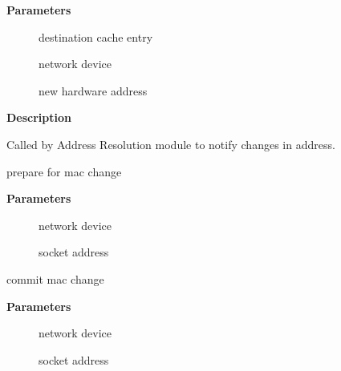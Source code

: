 \documentclass[a4paper,8pt,english]{sphinxmanual}
\begin{document}
\textbf{Parameters}
\begin{description}
\item[{}] \leavevmode
destination cache entry

\item[{}] \leavevmode
network device

\item[{}] \leavevmode
new hardware address

\end{description}

\textbf{Description}

Called by Address Resolution module to notify changes in address.

\begin{fulllineitems}
\label{networking/kapi:c.eth_prepare_mac_addr_change}
prepare for mac change

\end{fulllineitems}


\textbf{Parameters}
\begin{description}
\item[{}] \leavevmode
network device

\item[{}] \leavevmode
socket address

\end{description}

\begin{fulllineitems}
\label{networking/kapi:c.eth_commit_mac_addr_change}
commit mac change

\end{fulllineitems}


\textbf{Parameters}
\begin{description}
\item[{}] \leavevmode
network device

\item[{}] \leavevmode
socket address

\end{description}
\end{document}
